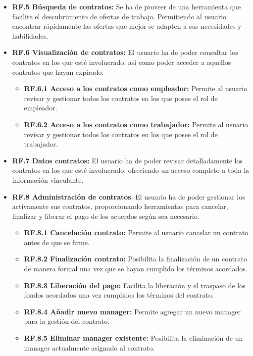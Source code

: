 \begin{itemize}
\item \textbf{RF.5 Búsqueda de contratos:} Se ha de proveer de una herramienta que facilite el descubrimiento de ofertas de trabajo. Permitiendo al usuario encontrar rápidamente las ofertas que mejor se adapten a sus necesidades y habilidades. 
	
\item \textbf{RF.6 Visualización de contratos:} El usuario ha de poder consultar los contratos en los que esté involucrado, así como poder acceder a aquellos contratos que hayan expirado.
	\begin{itemize}
	\item \textbf{RF.6.1 Acceso a los contratos como empleador:} Permite al usuario revisar y gestionar		 	todos los contratos en los que posee el rol de empleador.
	\item \textbf{RF.6.2 Acceso a los contratos como trabajador:} Permite al usuario revisar y gestionar		 	todos los contratos en los que posee el rol de trabajador.
	\end{itemize}
	
\item \textbf{RF.7 Datos contratos:} El usuario ha de poder revisar detalladamente los contratos en los que esté involucrado, ofreciendo un acceso completo a toda la información vinculante.
	
\item \textbf{RF.8 Administración de contratos}: El usuario ha de poder gestionar los activamente sus contratos, proporcionando herramientas para cancelar, finalizar y liberar el pago de los acuerdos según sea necesario.
	\begin{itemize}
	\item \textbf{RF.8.1 Cancelación contrato:} Permite al usuario cancelar un contrato antes de que	 	se firme.
	\item \textbf{RF.8.2 Finalización contrato:} Posibilita la finalización de un contrato de manera		formal una vez que se hayan cumplido los términos acordados.
	\item \textbf{RF.8.3 Liberación del pago:} Facilita la liberación y el traspaso de los fondos			acordados una vez cumplidos los términos del contrato.
	\item \textbf{RF.8.4 Añadir nuevo manager:} Permite agregar un nuevo manager para la gestión del		contrato.
	\item \textbf{RF.8.5 Eliminar manager existente:} Posibilita la eliminación de un manager
	actualmente asignado al contrato.
	\end{itemize}
	

\end{itemize}

